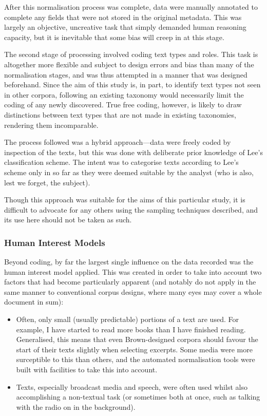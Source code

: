 After this normalisation process was complete, data were manually annotated to complete any fields that were not stored in the original metadata.  This was largely an objective, uncreative task that simply demanded human reasoning capacity, but it is inevitable that some bias will creep in at this stage.

The second stage of processing involved coding text types and roles.  This task is altogether more flexible and subject to design errors and bias than many of the normalisation stages, and was thus attempted in a manner that was designed beforehand.  Since the aim of this study is, in part, to identify text types not seen in other corpora, following an existing taxonomy would necessarily limit the coding of any newly discovered.  True free coding, however, is likely to draw distinctions between text types that are not made in existing taxonomies, rendering them incomparable.

The process followed was a hybrid approach---data were freely coded by inspection of the texts, but this was done with deliberate prior knowledge of Lee's classification scheme.  The intent was to categorise texts according to Lee's scheme only in so far as they were deemed suitable by the analyst (who is also, lest we forget, the subject).

Though this approach was suitable for the aims of this particular study, it is difficult to advocate for any others using the sampling techniques described, and its use here should not be taken as such.

\subsubsection{Human Interest Models}
Beyond coding, by far the largest single influence on the data recorded was the human interest model applied.  This was created in order to take into account two factors that had become particularly apparent (and notably do not apply in the same manner to conventional corpus designs, where many eyes may cover a whole document in sum):

\begin{itemize}
    \item Often, only small (usually predictable) portions of a text are used.  For example, I have started to read more books than I have finished reading.  Generalised, this means that even Brown-designed corpora should favour the start of their texts slightly when selecting excerpts.  Some media were more surceptible to this than others, and the automated normalisation tools were built with facilities to take this into account.
    \item Texts, especially broadcast media and speech, were often used whilst also accomplishing a non-textual task (or sometimes both at once, such as talking with the radio on in the background).
\end{itemize}

